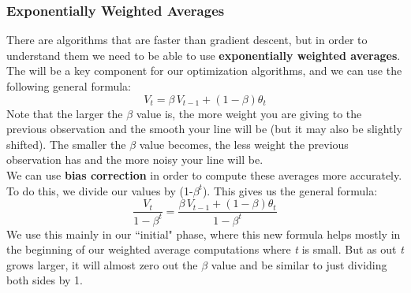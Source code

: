 \documentclass[11pt, a4paper]{article}
\begin{document}
\begin{spacing}{1.1}
	\subsubsection{Exponentially Weighted Averages}
	There are algorithms that are faster than gradient descent, but in order to understand them we need to be able to use \textbf{exponentially weighted averages}. The will be a key component for our optimization algorithms, and we can use the following general formula: $$ V_t = \beta\,V_{t-1} + (1-\beta)\theta_t$$
	Note that the larger the $\beta$ value is, the more weight you are giving to the previous observation and the smooth your line will be (but it may also be slightly shifted). The smaller the $\beta$ value becomes, the less weight the previous observation has and the more noisy your line will be. \vspace*{1mm} \\
	We can use \textbf{bias correction} in order to compute these averages more accurately. To do this, we divide our values by (1-$\beta^t$). This gives us the general formula: $$ \frac{V_t}{1-\beta^t} = \frac{\beta\,V_{t-1} + (1-\beta)\theta_t}{1-\beta^t}$$
	We use this mainly in our ``initial" phase, where this new formula helps mostly in the beginning of our weighted average computations where \textit{t} is small. But as out \textit{t} grows larger, it will almost zero out the $\beta$ value and be similar to just dividing both sides by 1. \newpage


\end{spacing}
\end{document}
